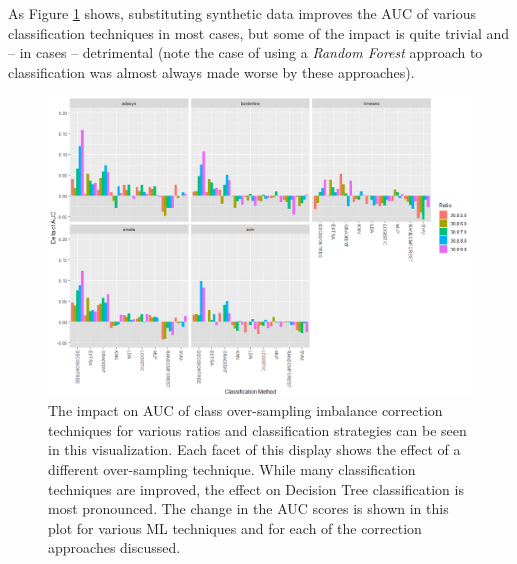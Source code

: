 \documentclass[letterpaper]{report}
\begin{document}
As Figure \ref{fig:imbalance} shows, substituting synthetic data improves the AUC of various classification techniques in most cases, but some of the impact is quite trivial and -- in cases -- detrimental (note the case of using a \textit{Random Forest} approach to classification was almost always made worse by these approaches). 
%
%
%
%
%
%
\begin{figure}[H]
	\centering
	\includegraphics[width=0.9\linewidth]{./figures/imbalance.png}
	\caption[Class imbalance correction techniques]{The impact on AUC of class over-sampling imbalance correction techniques for various ratios and classification strategies can be seen in this visualization. Each facet of this display shows the effect of a different over-sampling technique. While many classification techniques are improved, the effect on Decision Tree classification is most pronounced. The change in the AUC scores is shown in this plot for various ML techniques and for each of the correction approaches discussed.}
	\label{fig:imbalance}
\end{figure}
\end{document}
